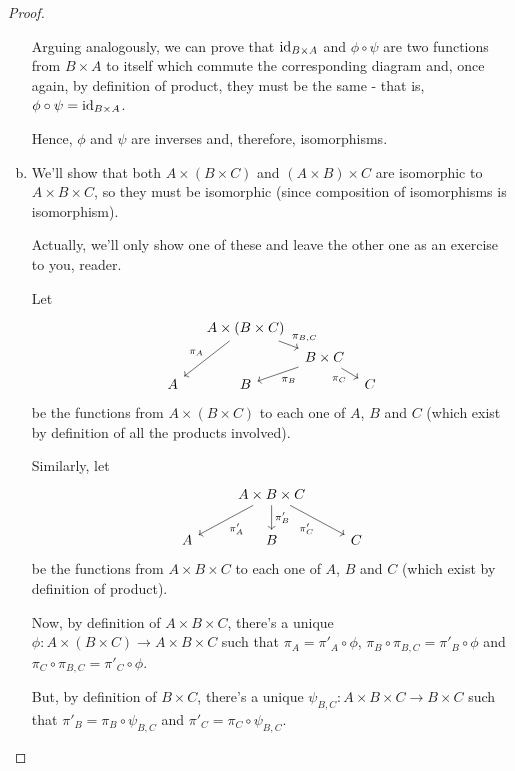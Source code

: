 \begin{proof}
\begin{enumerate}[(a)]
		Arguing analogously, we can prove that ${\rm id}_{B\times A}$ and $\phi\circ\psi$ are two functions from $B\times A$ to itself which commute the corresponding diagram and, once again, by definition of product, they must be the same - that is, $\phi\circ\psi={\rm id}_{B\times A}$.
		
		Hence, $\phi$ and $\psi$ are inverses and, therefore, isomorphisms.
		
		\item We'll show that both $A\times(B\times C)$ and $(A\times B)\times C$ are isomorphic to $A\times B\times C$, so they must be isomorphic (since composition of isomorphisms is isomorphism).
		
		Actually, we'll only show one of these and leave the other one as an exercise to you, reader.
		
		Let
		\[\begin{tikzcd}[row sep=tiny,column sep=tiny]
		&  & A\times(B\times C) \arrow[lldd, "\pi_A"'] \arrow[rd, "{\pi_{B,C}}"] &                                                    &   \\
		&  &                                                                     & B\times C \arrow[rd, "\pi_C"'] \arrow[ld, "\pi_B"] &   \\
		A &  & B                                                                   &                                                    & C
		\end{tikzcd}\]be the functions from $A\times(B\times C)$ to each one of $A$, $B$ and $C$ (which exist by definition of all the products involved).
		
		Similarly, let
		\[\begin{tikzcd}
		& A\times B\times C \arrow[ld, "\pi'_A"] \arrow[d, "\pi'_B"] \arrow[rd, "\pi'_C"'] &   \\
		A & B                                                                               & C
		\end{tikzcd}\]be the functions from $A\times B\times C$ to each one of $A$, $B$ and $C$ (which exist by definition of product).
		
		Now, by definition of $A\times B\times C$, there's a unique $\phi:A\times(B\times C)\to A\times B\times C$ such that $\pi_A=\pi'_A\circ\phi$, $\pi_B\circ\pi_{B,C}=\pi'_B\circ\phi$ and $\pi_C\circ\pi_{B,C}=\pi'_C\circ\phi$.
		
		But, by definition of $B\times C$, there's a unique $\psi_{B,C}:A\times B\times C\to B\times C$ such that $\pi'_B=\pi_B\circ\psi_{B,C}$ and $\pi'_C=\pi_C\circ\psi_{B,C}$.
		

\end{enumerate}
\end{proof}
